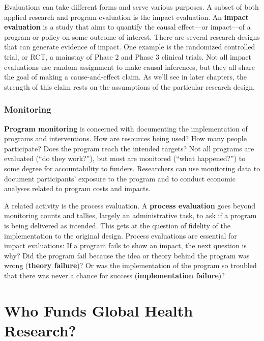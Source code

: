 \documentclass[
  letterpaper,
  DIV=11,
  numbers=noendperiod,
  oneside]{scrreprt}
\begin{document}
Evaluations can take different forms and serve various purposes. A
subset of both applied research and program evaluation is the impact
evaluation. An \textbf{impact evaluation} is a study that aims to
quantify the causal effect---or impact---of a program or policy on some
outcome of interest. There are several research designs that can
generate evidence of impact. One example is the randomized controlled
trial, or RCT, a mainstay of Phase 2 and Phase 3 clinical trials. Not
all impact evaluations use random assignment to make causal inferences,
but they all share the goal of making a cause-and-effect claim. As we'll
see in later chapters, the strength of this claim rests on the
assumptions of the particular research design.

\hypertarget{monitoring}{%
\subsubsection*{Monitoring}\label{monitoring}}

\textbf{Program monitoring} is concerned with documenting the
implementation of programs and interventions. How are resources being
used? How many people participate? Does the program reach the intended
targets? Not all programs are evaluated (``do they work?''), but most
are monitored (``what happened?'') to some degree for accountability to
funders. Researchers can use monitoring data to document participants'
exposure to the program and to conduct economic analyses related to
program costs and impacts.

A related activity is the process evaluation. A \textbf{process
evaluation} goes beyond monitoring counts and tallies, largely an
administrative task, to ask if a program is being delivered as intended.
This gets at the question of fidelity of the implementation to the
original design. Process evaluations are essential for impact
evaluations: If a program fails to show an impact, the next question is
why? Did the program fail because the idea or theory behind the program
was wrong (\textbf{theory failure})? Or was the implementation of the
program so troubled that there was never a chance for success
(\textbf{implementation failure})?

\hypertarget{who-funds-global-health-research}{%
\section{Who Funds Global Health
Research?}\label{who-funds-global-health-research}}
\end{document}

